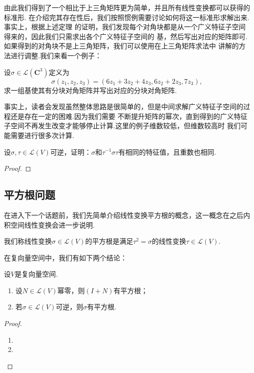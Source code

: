 由此我们得到了一个相比于上三角矩阵更为简单，并且所有线性变换都可以获得的标准形.
在介绍完其存在性后，我们按照惯例需要讨论如何将这一标准形求解出来.事实上，根据上述定理
的证明，我们发现每个对角块都是从一个广义特征子空间得来的，因此我们只需求出各个广义特征子空间的
基，然后写出对应的矩阵即可.如果得到的对角块不是上三角矩阵，我们可以使用在上三角矩阵求法中
讲解的方法进行调整.我们来看一个例子：
\begin{example}
    设$\sigma\in \mathcal{L}(\mathbf{C}^3)$定义为
    \[\sigma(z_1,z_2,z_3)=(6z_1+3z_2+4z_3,6z_2+2z_3,7z_3),\]求一组基使其有分块对角矩阵并写出对应的分块对角矩阵.
\end{example}
\begin{solution}

\end{solution}

事实上，读者会发现虽然整体思路是很简单的，但是中间求解广义特征子空间的过程还是存在一定的困难.因为我们需要
不断提升矩阵的幂次，直到得到的广义特征子空间不再发生改变才能够停止计算.这里的例子维数较低，但维数较高时
我们可能需要进行很多次计算.

\begin{example}
    设$\sigma,\tau\in \mathcal{L}(V)$可逆，证明：$\sigma$和$\tau^{-1}\sigma\tau$有相同的特征值，且重数也相同.
\end{example}
\begin{proof}
    
\end{proof}

\subsection{平方根问题}
在进入下一个话题前，我们先简单介绍线性变换平方根的概念，这一概念在之后内积空间线性变换会进一步说明.
\begin{definition}
    我们称线性变换$\sigma\in \mathcal{L}(V)$的平方根是满足$\tau^2=\sigma$的线性变换$\tau\in \mathcal{L}(V)$.
\end{definition}
在复向量空间中，我们有如下两个结论：
\begin{theorem} \label{thm:19:幂零平方根}
    设$V$是复向量空间.
    \begin{enumerate}[label=(\arabic*)]
        \item 设$N\in \mathcal{L}(V)$幂零，则$(I+N)$有平方根；
        \item 若$\sigma\in \mathcal{L}(V)$可逆，则$\sigma$有平方根.
    \end{enumerate}
\end{theorem}
\begin{proof}
    \begin{enumerate}[label=(\arabic*)]
        \item 
        \item 
    \end{enumerate}
\end{proof}

